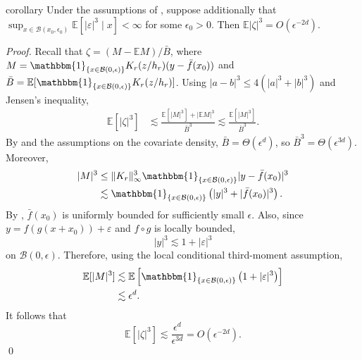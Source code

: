 \documentclass[11pt]{article}
\begin{document}
\begin{appendices}
\begin{restatable}{corollary}{} \label{corr: zeta third moment}
    Under the assumptions of , suppose additionally that $\sup_{x\in\mathcal{B}(x_0,\epsilon_0)}\mathbb{E}[|\varepsilon|^3\mid x]<\infty$ for some $\epsilon_0>0$. Then $\mathbb{E}|\zeta|^3 = O(\epsilon^{-2d})$.
\end{restatable}
\noindent \textit{Proof.} Recall that $\zeta=(M-\mathbb{E}M)/\bar B$, where $M=\mathbbm{1}_{\{x\in\mathcal{B}(0,\epsilon)\}}K_r(z/h_r)(y-\bar f(x_0))$ and $\bar B=\mathbb{E}[\mathbbm{1}_{\{x\in\mathcal{B}(0,\epsilon)\}}K_r(z/h_r)]$. Using $|a-b|^3\leq4(|a|^3+|b|^3)$ and Jensen's inequality,
\begin{align*}
    \mathbb{E}[|\zeta|^3]
    &\lesssim \frac{\mathbb{E}[|M|^3]+|\mathbb{E}M|^3}{\bar B^3}
    \lesssim \frac{\mathbb{E}[|M|^3]}{\bar B^3}.
\end{align*}
By  and the assumptions on the covariate density, $\bar B=\Theta(\epsilon^d)$, so $\bar B^3=\Theta(\epsilon^{3d})$. Moreover,
\begin{align*}
    |M|^3
    &\leq \|K_r\|_\infty^3\mathbbm{1}_{\{x\in\mathcal{B}(0,\epsilon)\}}|y-\bar f(x_0)|^3 \\
    &\lesssim \mathbbm{1}_{\{x\in\mathcal{B}(0,\epsilon)\}}\left(|y|^3+|\bar f(x_0)|^3\right).
\end{align*}
By , $\bar f(x_0)$ is uniformly bounded for sufficiently small $\epsilon$. Also, since $y=f(g(x+x_0))+\varepsilon$ and $f\circ g$ is locally bounded,
\[
    |y|^3 \lesssim 1+|\varepsilon|^3
\]
on $\mathcal{B}(0,\epsilon)$. Therefore, using the local conditional third-moment assumption,
\begin{align*}
    \mathbb{E}[|M|^3]
    &\lesssim \mathbb{E}\left[\mathbbm{1}_{\{x\in\mathcal{B}(0,\epsilon)\}}\left(1+|\varepsilon|^3\right)\right] \\
    &\lesssim \epsilon^d.
\end{align*}
It follows that
\[
    \mathbb{E}[|\zeta|^3]
    \lesssim \frac{\epsilon^d}{\epsilon^{3d}}
    = O(\epsilon^{-2d}).
\]
\qed{}


\end{appendices}
\end{document}
